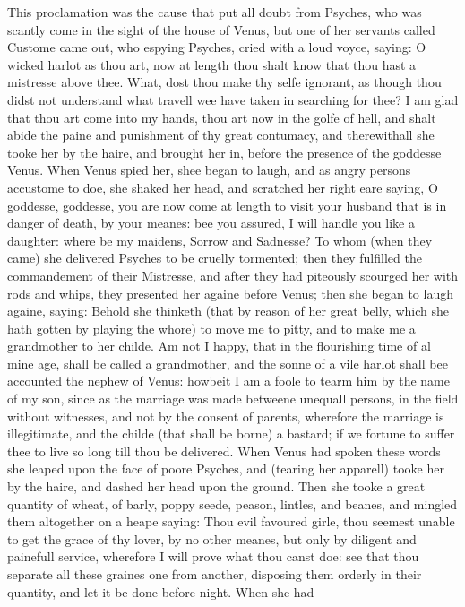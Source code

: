 This proclamation was the cause that put all doubt from Psyches, who was
scantly come in the sight of the house of Venus, but one of her servants called
Custome came out, who espying Psyches, cried with a loud voyce, saying: O
wicked harlot as thou art, now at length thou shalt know that thou hast a
mistresse above thee. What, dost thou make thy selfe ignorant, as though thou
didst not understand what travell wee have taken in searching for thee? I am
glad that thou art come into my hands, thou art now in the golfe of hell, and
shalt abide the paine and punishment of thy great contumacy, and therewithall
she tooke her by the haire, and brought her in, before the presence of the
goddesse Venus. When Venus spied her, shee began to laugh, and as angry persons
accustome to doe, she shaked her head, and scratched her right eare saying, O
goddesse, goddesse, you are now come at length to visit your husband that is in
danger of death, by your meanes: bee you assured, I will handle you like a
daughter: where be my maidens, Sorrow and Sadnesse? To whom (when they came)
she delivered Psyches to be cruelly tormented; then they fulfilled the
commandement of their Mistresse, and after they had piteously scourged her with
rods and whips, they presented her againe before Venus; then she began to laugh
againe, saying: Behold she thinketh (that by reason of her great belly, which
she hath gotten by playing the whore) to move me to pitty, and to make me a
grandmother to her childe. Am not I happy, that in the flourishing time of al
mine age, shall be called a grandmother, and the sonne of a vile harlot shall
bee accounted the nephew of Venus: howbeit I am a foole to tearm him by the
name of my son, since as the marriage was made betweene unequall persons, in
the field without witnesses, and not by the consent of parents, wherefore the
marriage is illegitimate, and the childe (that shall be borne) a bastard; if we
fortune to suffer thee to live so long till thou be delivered. When Venus had
spoken these words she leaped upon the face of poore Psyches, and (tearing her
apparell) tooke her by the haire, and dashed her head upon the ground. Then she
tooke a great quantity of wheat, of barly, poppy seede, peason, lintles, and
beanes, and mingled them altogether on a heape saying: Thou evil favoured
girle, thou seemest unable to get the grace of thy lover, by no other meanes,
but only by diligent and painefull service, wherefore I will prove what thou
canst doe: see that thou separate all these graines one from another, disposing
them orderly in their quantity, and let it be done before night. When she had
